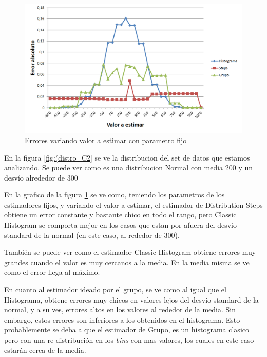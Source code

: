 	\begin{figure}[H]
	  \begin{center}
	    \includegraphics[scale=.40]{imagenes/C2_variando_valor.png}
	    \caption{Errores variando valor a estimar con parametro fijo} 
	    \label{fig:C2_variando_valor}
	  \end{center}
	\end{figure}
		
		En la figura \ref{fig:(distro_C2} se ve la distribucion del set de datos que estamos analizando. Se puede ver como es una distribucion Normal con media 200 y un desv\'io alrededor de 300
		
		En la grafico de la figura \ref{fig:C2_variando_valor} se ve como, teniendo los parametros de los estimadores fijos, y variando el valor a estimar, el estimador de Distribution Steps obtiene un error constante y bastante chico en todo el rango, pero Classic Histogram se comporta mejor en los casos que estan por afuera del desvio standard de la normal (en este caso, al rededor de 300).
		
		Tambi\'en se puede ver como el estimador Classic Histogram obtiene errores muy grandes cuando el valor es muy cercanos a la media. En la media misma se ve como el error llega al m\'aximo.
		
		En cuanto al estimador ideado por el grupo, se ve como al igual que el Histograma, obtiene errores muy chicos en valores lejos del desvio standard de la normal, y a su ves, errores altos en los valores al rededor de la media. Sin embargo, estos errores son inferiores a los obtenidos en el histograma. Esto probablemente se deba a que el estimador de Grupo, es un histograma clasico pero con una re-distribuci\'on en los \textit{bins} con mas valores, los cuales en este caso estarán cerca de la media.
	

